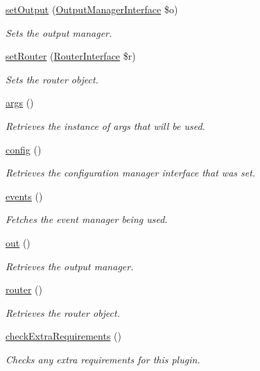 \begin{DoxyCompactItemize}
\hyperlink{classGenericPlugin_a00fb20d417f3ad2f9839591a84348218}{set\-Output} (\hyperlink{interfaceOutputManagerInterface}{Output\-Manager\-Interface} \$o)
\begin{DoxyCompactList}\small\item\em Sets the output manager. \end{DoxyCompactList}\item 
\hyperlink{classGenericPlugin_ac03553d95ea0e2d5023e3f78ef85f4b9}{set\-Router} (\hyperlink{interfaceRouterInterface}{Router\-Interface} \$r)
\begin{DoxyCompactList}\small\item\em Sets the router object. \end{DoxyCompactList}\item 
\hyperlink{classGenericPlugin_a1ce2fea9e153e37e019ff4b72fd3b819}{args} ()
\begin{DoxyCompactList}\small\item\em Retrieves the instance of args that will be used. \end{DoxyCompactList}\item 
\hyperlink{classGenericPlugin_aa7c4a335f37ee83cd131be29ed469c82}{config} ()
\begin{DoxyCompactList}\small\item\em Retrieves the configuration manager interface that was set. \end{DoxyCompactList}\item 
\hyperlink{classGenericPlugin_ab7d46f8bdaf1540eee1b988073294298}{events} ()
\begin{DoxyCompactList}\small\item\em Fetches the event manager being used. \end{DoxyCompactList}\item 
\hyperlink{classGenericPlugin_a005937e2c819abbb56fdc4b10fdeb666}{out} ()
\begin{DoxyCompactList}\small\item\em Retrieves the output manager. \end{DoxyCompactList}\item 
\hyperlink{classGenericPlugin_adc6c23c436e9979ed2c5b07dde6f3931}{router} ()
\begin{DoxyCompactList}\small\item\em Retrieves the router object. \end{DoxyCompactList}\item 
\hyperlink{classGenericPlugin_a53983a917eccd1ee4b06355f688c0960}{check\-Extra\-Requirements} ()
\begin{DoxyCompactList}\small\item\em Checks any extra requirements for this plugin. \end{DoxyCompactList}\end{DoxyCompactItemize}
